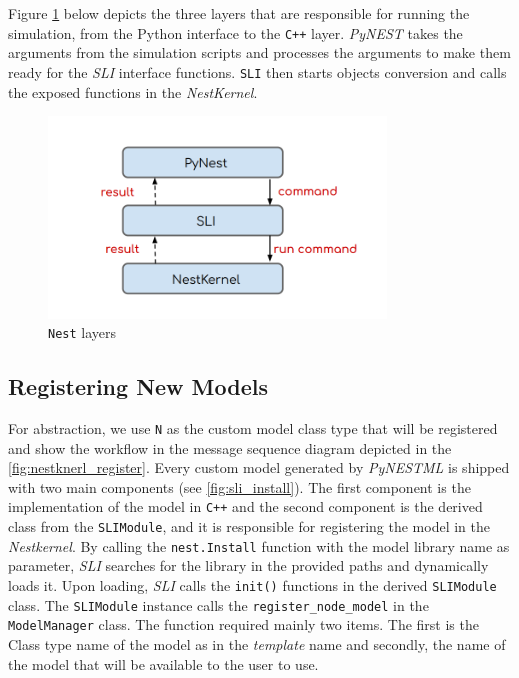 Figure \ref{fig:layer} below depicts the three layers that are responsible for running the simulation, from the Python interface to the \texttt{C++} layer. \emph{PyNEST} takes the arguments from the simulation scripts and processes the arguments to make them ready for the \emph{SLI} interface functions. \texttt{SLI} then starts objects conversion and calls the exposed functions in the \emph{NestKernel}.

\begin{figure}[h!]
\centering
\includegraphics[width=0.8\textwidth]{src/pic/layers.png}
\caption{\texttt{Nest} layers}
\label{fig:layer}
\end{figure}

\subsection{Registering New Models}

For abstraction, we use \texttt{N} as the custom model class type that will be registered and show the workflow in the message sequence diagram depicted in the   \autoref{fig:nestknerl_register}.  Every custom model generated by \emph{PyNESTML} is shipped with two main components (see \autoref{fig:sli_install}). The first component is the implementation of the model in \texttt{C++} and the second component is the derived class from the \texttt{SLIModule}, and it is responsible for registering the model in the \emph{Nestkernel}. By calling the \texttt{nest.Install} function
with the model library name as parameter, \emph{SLI} searches for the library in the provided paths and dynamically loads it. Upon loading, \emph{SLI} calls the \texttt{init()} functions in the derived \texttt{SLIModule} class. The \texttt{SLIModule} instance calls the \texttt{register\_node\_model}  in the \texttt{ModelManager} class. The function required mainly two items. The first is the Class  type name of the model as in the \emph{template} name and secondly, the name of the model that will be available to the user to use. 

